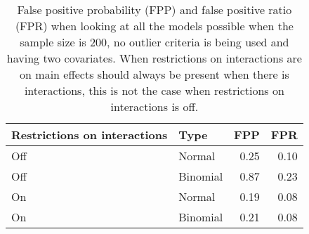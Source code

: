 \begin{longtable}{llrr}
\caption{False positive probability (FPP) and false positive ratio (FPR) when looking at all the models possible when the sample size is 200, no outlier criteria is being used and having two covariates. When restrictions on interactions are on main effects should always be present when there is interactions, this is not the case when restrictions on interactions is off.} \\ 
  \hline
Restrictions on interactions & Type & FPP & FPR \\ 
  \hline
Off & Normal & 0.25 & 0.10 \\ 
  Off & Binomial & 0.87 & 0.23 \\ 
  On & Normal & 0.19 & 0.08 \\ 
  On & Binomial & 0.21 & 0.08 \\ 
   \hline
\hline
\end{longtable}
